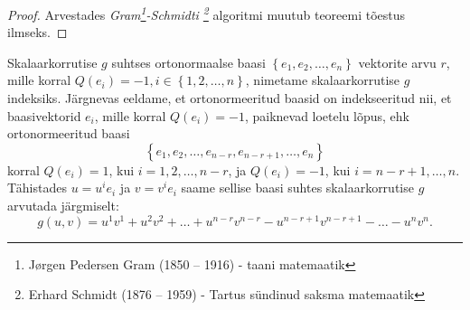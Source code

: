 \documentclass[a4paper,12pt]{article}
\numberwithin{equation}{section}
\begin{document}
\begin{proof}
Arvestades \textit{Gram\footnote{Jørgen Pedersen Gram (1850 – 1916) - taani matemaatik}-Schmidti \footnote{Erhard Schmidt (1876 – 1959) - Tartus sündinud saksma matemaatik}} algoritmi muutub teoreemi tõestus ilmseks.
\end{proof}
Skalaarkorrutise $g$ suhtses ortonormaalse baasi $\left\lbrace e_1, e_2, \dots, e_n \right\rbrace$ vektorite arvu $r$, mille korral $Q \left(e_i\right) = -1, i \in \left\lbrace 1, 2, \dots, n \right\rbrace$, nimetame skalaarkorrutise $g$ indeksiks.
Järgnevas eeldame, et ortonormeeritud baasid on indekseeritud nii, et baasivektorid $e_i$, mille korral $Q \left(e_i\right) = -1$, paiknevad loetelu lõpus, ehk ortonormeeritud baasi 
\[\left\lbrace e_1, e_2, \dots, e_{n-r}, e_{n-r+1}, \dots, e_n \right\rbrace\]
korral $Q \left(e_i\right) = 1$, kui $i = 1, 2, \dots, n-r$, ja $Q \left(e_i\right) = -1$, kui $i = n-r+1, \dots, n$. Tähistades $u = u^i e_i$ ja $v = v^i e_i$ saame sellise baasi suhtes skalaarkorrutise $g$ arvutada järgmiselt:
\[g\left(u, v\right) = u^1 v^1 + u^2 v^2 + \dots + u^{n-r} v^{n-r} - u^{n-r+1} v^{n-r+1} - \dots - u^n v^n.\]
\vfill 
\end{document}
